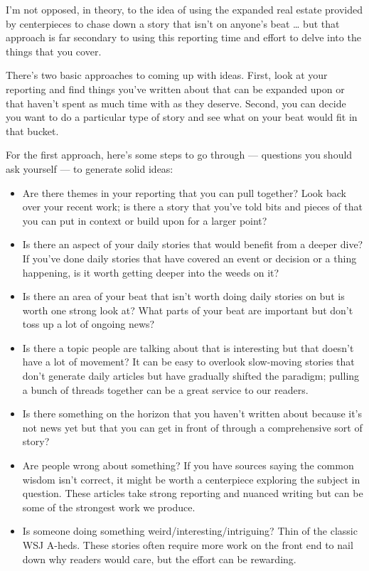 \documentclass[
  11pt,
  american,
  letterpaperpaper,
  extrafontsizes,onecolumn,openright
  ]{memoir}
\providecommand{\tightlist}{%
  \setlength{\itemsep}{0pt}\setlength{\parskip}{0pt}}
\begin{document}
I'm not opposed, in theory, to the idea of using the expanded real estate provided by centerpieces to chase down a story that isn't on anyone's beat \ldots{} but that approach is far secondary to using this reporting time and effort to delve into the things that you cover.

There's two basic approaches to coming up with ideas. First, look at your reporting and find things you've written about that can be expanded upon or that haven't spent as much time with as they deserve. Second, you can decide you want to do a particular type of story and see what on your beat would fit in that bucket.

For the first approach, here's some steps to go through --- questions you should ask yourself --- to generate solid ideas:

\begin{itemize}
\tightlist
\item
  Are there themes in your reporting that you can pull together? Look back over your recent work; is there a story that you've told bits and pieces of that you can put in context or build upon for a larger point?
\item
  Is there an aspect of your daily stories that would benefit from a deeper dive? If you've done daily stories that have covered an event or decision or a thing happening, is it worth getting deeper into the weeds on it?
\item
  Is there an area of your beat that isn't worth doing daily stories on but is worth one strong look at? What parts of your beat are important but don't toss up a lot of ongoing news?
\item
  Is there a topic people are talking about that is interesting but that doesn't have a lot of movement? It can be easy to overlook slow-moving stories that don't generate daily articles but have gradually shifted the paradigm; pulling a bunch of threads together can be a great service to our readers.
\item
  Is there something on the horizon that you haven't written about because it's not news yet but that you can get in front of through a comprehensive sort of story?
\item
  Are people wrong about something? If you have sources saying the common wisdom isn't correct, it might be worth a centerpiece exploring the subject in question. These articles take strong reporting and nuanced writing but can be some of the strongest work we produce.
\item
  Is someone doing something weird/interesting/intriguing? Thin of the classic WSJ A-heds. These stories often require more work on the front end to nail down why readers would care, but the effort can be rewarding.

\end{itemize}
\end{document}
